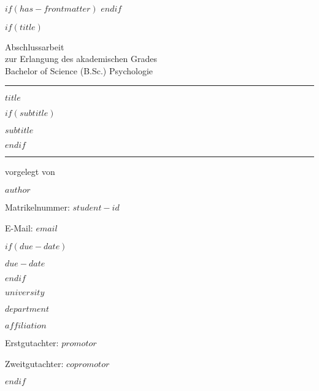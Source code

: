 $if(has-frontmatter)$
\frontmatter
$endif$

$if(title)$
\thispagestyle{empty}
{\centering
Abschlussarbeit \\
zur Erlangung des akademischen Grades \\
Bachelor of Science (B.Sc.) Psychologie \\
\vspace*{10mm}
\hrule
\vspace*{15mm}
{\large\bfseries $title$ \par}
$if(subtitle)$
{\large\bfseries $subtitle$ \par}
$endif$

\vspace*{15mm}
\hrule
\vspace*{10mm}
vorgelegt von  \\ 
{\large\bfseries $author$ \par}
\smallskip
{Matrikelnummer: $student-id$ \par}
{E-Mail: $email$ \par}

\bigskip 

$if(due-date)$
{\textmd\large $due-date$ \par}
$endif$

\bigskip

{\textmd\large $university$ \par}
{\textmd\large $department$ \par}
{\textmd\large $affiliation$ \par}

\bigskip\bigskip\bigskip

{Erstgutachter: $promotor$ \par}
{Zweitgutachter: $copromotor$ \par}

\vspace*{10mm}

}
$endif$